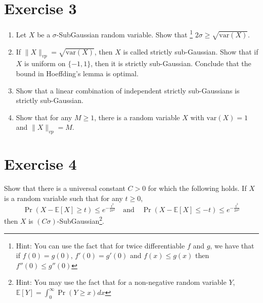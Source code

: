 \documentclass[a4 paper]{article}
\numberwithin{equation}{section}
\theoremstyle{boldStyle}
\theoremstyle{boldBlueStyle}
\theoremstyle{boldPurpleStyle}
\theoremstyle{boldRedStyle}
\begin{document}
\newpage
\section*{Exercise 3}
\begin{enumerate}
\item \textcolor{blueColor}{Let \(X\) be a \(\sigma\)-SubGaussian random variable. Show that
\footnote{Hint: You can use the fact that for twice differentiable \( f \) and \( g \), we have that if \( f(0) = g(0) \), \( f'(0) = g'(0) \) and \( f(x) \leq g(x) \) then \( f''(0) \leq g''(0) \)}
\(2\sigma \geq \sqrt{\mathrm{var}(X)}\).}












\newpage
\item \textcolor{blueColor}{If \(\|X\|_{vp} = \sqrt{\mathrm{var}(X)}\), then \(X\) is called strictly sub-Gaussian. 
Show that if \(X\) is uniform on \(\{-1, 1\}\), then it is strictly sub-Gaussian. Conclude that the bound in Hoeffding's lemma is optimal.}






\newpage
\item \textcolor{blueColor}{Show that a linear combination of independent strictly sub-Gaussians is strictly sub-Gaussian.}





\newpage
\item \textcolor{blueColor}{Show that for any \(M \geq 1\), there is a random variable \(X\) with \(\mathrm{var}(X) = 1\) and \(\|X\|_{vp} = M\).}








\end{enumerate}

\newpage
\section*{Exercise 4}
\textcolor{blueColor}{
Show that there is a universal constant \(C > 0\) for which the following holds. If \(X\) is a random variable such that for any \(t \geq 0\),
\[
\Pr(X - \mathbb{E}[X] \geq t) \leq e^{-\frac{t^2}{2\sigma^2}} \quad \text{and} \quad \Pr(X - \mathbb{E}[X] \leq -t) \leq e^{-\frac{t^2}{2\sigma^2}}
\]
then \(X\) is \((C\sigma)\)-SubGaussian\footnote{Hint: You may use the fact that for a non-negative random variable \(Y\), \(\mathbb{E}[Y] = \int_0^\infty \Pr(Y \geq x)dx\)}.
}
\end{document}
